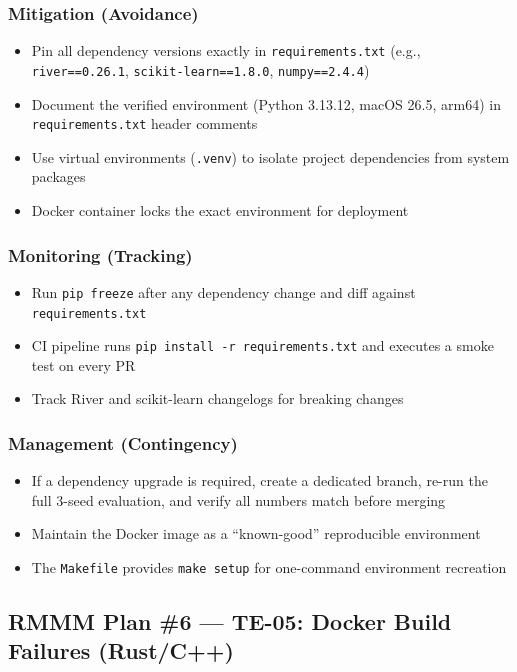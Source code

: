 \documentclass[11pt, a4paper]{article}
\newcommand{\col}[1]{\texttt{\small #1}}
\begin{document}
\subsubsection*{Mitigation (Avoidance)}
\begin{itemize}[leftmargin=*]
    \item Pin all dependency versions exactly in \col{requirements.txt} (e.g., \col{river==0.26.1}, \col{scikit-learn==1.8.0}, \col{numpy==2.4.4})
    \item Document the verified environment (Python 3.13.12, macOS 26.5, arm64) in \col{requirements.txt} header comments
    \item Use virtual environments (\col{.venv}) to isolate project dependencies from system packages
    \item Docker container locks the exact environment for deployment
\end{itemize}

\subsubsection*{Monitoring (Tracking)}
\begin{itemize}[leftmargin=*]
    \item Run \col{pip freeze} after any dependency change and diff against \col{requirements.txt}
    \item CI pipeline runs \col{pip install -r requirements.txt} and executes a smoke test on every PR
    \item Track River and scikit-learn changelogs for breaking changes
\end{itemize}

\subsubsection*{Management (Contingency)}
\begin{itemize}[leftmargin=*]
    \item If a dependency upgrade is required, create a dedicated branch, re-run the full 3-seed evaluation, and verify all numbers match before merging
    \item Maintain the Docker image as a ``known-good'' reproducible environment
    \item The \col{Makefile} provides \col{make setup} for one-command environment recreation
\end{itemize}

\subsection{RMMM Plan \#6 --- TE-05: Docker Build Failures (Rust/C++)}
\end{document}

